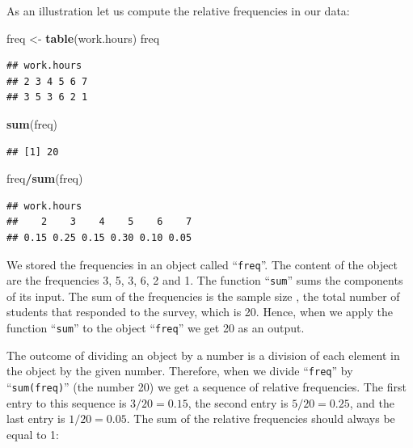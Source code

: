 \documentclass[]{krantz}
\makeatletter
\newenvironment{Shaded}{\begin{snugshade}}{\end{snugshade}}
\newcommand{\KeywordTok}[1]{\textcolor[rgb]{0.13,0.29,0.53}{\textbf{#1}}}
\newcommand{\StringTok}[1]{\textcolor[rgb]{0.31,0.60,0.02}{#1}}
\newcommand{\OperatorTok}[1]{\textcolor[rgb]{0.81,0.36,0.00}{\textbf{#1}}}
\newcommand{\NormalTok}[1]{#1}
\newenvironment{kframe}{%
\medskip{}
\setlength{\fboxsep}{.8em}
 \def\at@end@of@kframe{}%
 \ifinner\ifhmode%
  \def\at@end@of@kframe{\end{minipage}}%
  \begin{minipage}{\columnwidth}%
 \fi\fi%
 \def\FrameCommand##1{\hskip\@totalleftmargin \hskip-\fboxsep
 \colorbox{shadecolor}{##1}\hskip-\fboxsep
     \hskip-\linewidth \hskip-\@totalleftmargin \hskip\columnwidth}%
 \MakeFramed {\advance\hsize-\width
   \@totalleftmargin\z@ \linewidth\hsize
   \@setminipage}}%
 {\par\unskip\endMakeFramed%
 \at@end@of@kframe}
\renewenvironment{Shaded}{\begin{kframe}}{\end{kframe}}
\theoremstyle{definition}
\theoremstyle{definition}
\theoremstyle{definition}
\theoremstyle{remark}
\makeatother
\begin{document}
As an illustration let us compute the relative frequencies in our data:

\begin{Shaded}
\begin{Highlighting}[]
\NormalTok{freq <-}\StringTok{ }\KeywordTok{table}\NormalTok{(work.hours)}
\NormalTok{freq}
\end{Highlighting}
\end{Shaded}

\begin{verbatim}
## work.hours
## 2 3 4 5 6 7 
## 3 5 3 6 2 1
\end{verbatim}

\begin{Shaded}
\begin{Highlighting}[]
\KeywordTok{sum}\NormalTok{(freq)}
\end{Highlighting}
\end{Shaded}

\begin{verbatim}
## [1] 20
\end{verbatim}

\begin{Shaded}
\begin{Highlighting}[]
\NormalTok{freq}\OperatorTok{/}\KeywordTok{sum}\NormalTok{(freq)}
\end{Highlighting}
\end{Shaded}

\begin{verbatim}
## work.hours
##    2    3    4    5    6    7 
## 0.15 0.25 0.15 0.30 0.10 0.05
\end{verbatim}

We stored the frequencies in an object called ``\texttt{freq}''. The
content of the object are the frequencies 3, 5, 3, 6, 2 and 1. The
function ``\texttt{sum}'' sums the components of its input. The sum of
the frequencies is the sample size , the total number of students that
responded to the survey, which is 20. Hence, when we apply the function
``\texttt{sum}'' to the object ``\texttt{freq}'' we get 20 as an output.

The outcome of dividing an object by a number is a division of each
element in the object by the given number. Therefore, when we divide
``\texttt{freq}'' by ``\texttt{sum(freq)}'' (the number 20) we get a
sequence of relative frequencies. The first entry to this sequence is
\(3/20 = 0.15\), the second entry is \(5/20 = 0.25\), and the last entry
is \(1/20 = 0.05\). The sum of the relative frequencies should always be
equal to 1:
\end{document}
